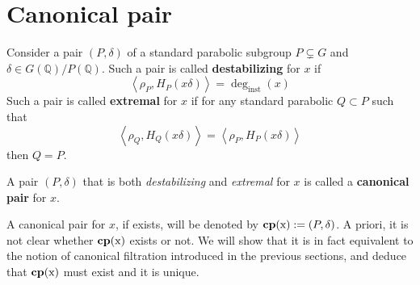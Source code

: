 \section{Canonical pair}
Consider a pair $(P,\delta)$ of a standard parabolic subgroup $P \subsetneq G$ and $\delta \in G(\mathbb{Q})/P(\mathbb{Q})$. Such a pair is called \textbf{destabilizing} for $x$ if
\[\left\langle \rho_P, H_P(x\delta)\right\rangle = \deg_{\text{inst}}(x)\]
Such a pair is called \textbf{extremal} for $x$ if for any standard parabolic $Q \subset P$ such that
\[\left\langle \rho_Q, H_Q(x\delta)\right\rangle = \left\langle \rho_P, H_P(x\delta)\right\rangle\]
then $Q=P$.
\begin{definition}
    A pair $(P,\delta)$ that is both \textit{destabilizing} and \textit{extremal} for $x$ is called a \textbf{canonical pair} for $x$.
\end{definition}
A canonical pair for $x$, if exists, will be denoted by $\operatorname{\textbf{cp}(x)}:=(P,\delta)$. A priori, it is not clear whether $\operatorname{\textbf{cp}(x)}$ exists or not.
We will show that it is in fact equivalent to the notion of canonical filtration introduced in the previous sections, and deduce that
$\operatorname{\textbf{cp}(x)}$ must exist and it is unique.

